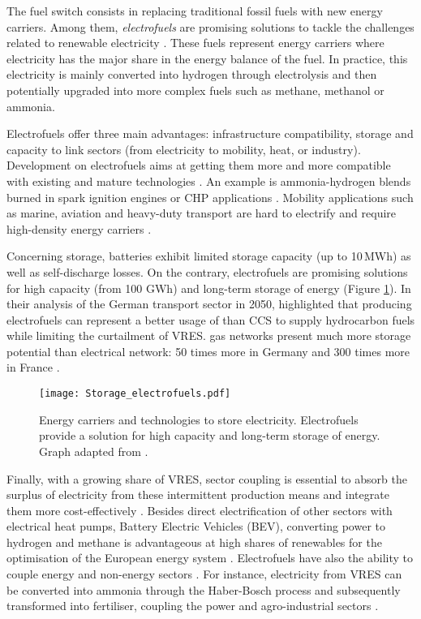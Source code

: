 The fuel switch consists in replacing traditional fossil fuels with new energy carriers.  Among them, \textit{electrofuels} are promising solutions to tackle the challenges related to renewable electricity \cite{rozzi2020}. These fuels represent energy carriers where electricity has the major share in the energy balance of the fuel. In practice, this electricity is mainly converted into hydrogen through electrolysis and then potentially upgraded into more complex fuels such as methane, methanol or ammonia. 

Electrofuels offer three main advantages: infrastructure compatibility, storage and capacity to link sectors (\ie from electricity to mobility, heat, or industry). Development on electrofuels aims at getting them more and more compatible with existing and mature technologies \cite{Ahlgren2012}. An example is ammonia-hydrogen blends burned in spark ignition engines \cite{lhuillier2020experimental} or \gls{CHP} applications \cite{pochet202022}. Mobility applications such as marine, aviation and heavy-duty transport are hard to electrify and require high-density energy carriers \cite{horvath2018techno, brynolf2018}.  

Concerning storage,  batteries exhibit limited storage capacity (up to 10\,MWh) as well as self-discharge losses. On the contrary, electrofuels are promising solutions for high capacity (from 100 GWh) and long-term storage of energy \cite{child2018role, dias2020energy} (Figure \ref{fig:intro:Storage_electrofuels}). In their analysis of the German transport sector in 2050, \citet{millinger2021electrofuels} highlighted that producing electrofuels can represent a better usage of  than \gls{CCS} to supply hydrocarbon fuels while limiting the curtailment of \gls{VRES}.  gas networks present much more storage potential than electrical network: 50 times more in Germany and 300 times more in France \cite{Rosa2017}. 

\begin{figure}[htbp!]
\centering
\texttt{[image: Storage\_electrofuels.pdf]}
\caption{Energy carriers and technologies to store electricity. Electrofuels provide a solution for high capacity and long-term storage of energy. Graph adapted from \cite{ISPT2017}.}
\label{fig:intro:Storage_electrofuels}
\end{figure}

Finally, with a growing share of \gls{VRES}, sector coupling is essential to absorb the surplus of electricity from these intermittent production means \cite{robinius2017linking} and integrate them more cost-effectively \cite{brown2018response, limpensECOS2021}. Besides direct electrification of other sectors with electrical heat pumps, Battery Electric Vehicles (BEV),  converting power to hydrogen and methane is advantageous at high shares of renewables for the optimisation of the European energy system \cite{brown2018synergies}. Electrofuels have also the ability to couple energy and non-energy sectors \cite{Stancin2020}. For instance, electricity from \gls{VRES} can be converted into ammonia through the Haber-Bosch process and subsequently transformed into fertiliser, coupling the power and agro-industrial sectors \cite{verleysen2020can}. 

